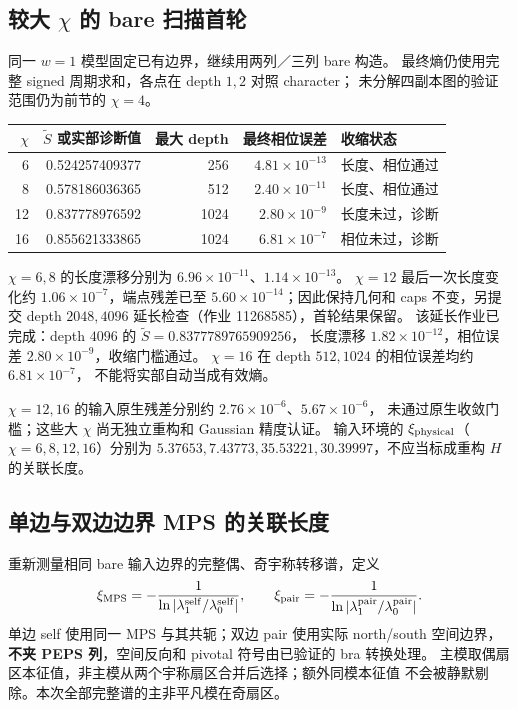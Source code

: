 \documentclass[11pt]{article}
\newcommand{\tS}{\widetilde S}
\begin{document}
\subsection{较大 $\chi$ 的 bare 扫描首轮}

同一 $w=1$ 模型固定已有边界，继续用两列／三列 bare 构造。
最终熵仍使用完整 signed 周期求和，各点在 depth $1,2$ 对照 character；
未分解四副本图的验证范围仍为前节的 $\chi=4$。
\begin{center}
\begin{tabular}{rrrrl}
\toprule
$\chi$ & $\tS$ 或实部诊断值 & 最大 depth & 最终相位误差 & 收缩状态\\
\midrule
6 & 0.524257409377 & 256 & $4.81\times10^{-13}$ & 长度、相位通过\\
8 & 0.578186036365 & 512 & $2.40\times10^{-11}$ & 长度、相位通过\\
12 & 0.837778976592 & 1024 & $2.80\times10^{-9}$ & 长度未过，诊断\\
16 & 0.855621333865 & 1024 & $6.81\times10^{-7}$ & 相位未过，诊断\\
\bottomrule
\end{tabular}
\end{center}
$\chi=6,8$ 的长度漂移分别为 $6.96\times10^{-11}$、$1.14\times10^{-13}$。
$\chi=12$ 最后一次长度变化约 $1.06\times10^{-7}$，端点残差已至
$5.60\times10^{-14}$；因此保持几何和 caps 不变，另提交 depth $2048,4096$
延长检查（作业 11268585），首轮结果保留。
该延长作业已完成：depth $4096$ 的 $\tS=0.8377789765909256$，
长度漂移 $1.82\times10^{-12}$，相位误差 $2.80\times10^{-9}$，收缩门槛通过。
$\chi=16$ 在 depth $512,1024$ 的相位误差均约 $6.81\times10^{-7}$，
不能将实部自动当成有效熵。

$\chi=12,16$ 的输入原生残差分别约 $2.76\times10^{-6}$、$5.67\times10^{-6}$，
未通过原生收敛门槛；这些大 $\chi$ 尚无独立重构和 Gaussian 精度认证。
输入环境的 $\xi_{\rm physical}$（$\chi=6,8,12,16$）分别为
$5.37653,7.43773,35.53221,30.39997$，不应当标成重构 $H$ 的关联长度。

\subsection{单边与双边边界 MPS 的关联长度}

重新测量相同 bare 输入边界的完整偶、奇宇称转移谱，定义
\begin{equation}
 \xi_{\rm MPS}=-\frac{1}{\ln|\lambda_1^{\rm self}/\lambda_0^{\rm self}|},\qquad
 \xi_{\rm pair}=-\frac{1}{\ln|\lambda_1^{\rm pair}/\lambda_0^{\rm pair}|}.
\end{equation}
单边 self 使用同一 MPS 与其共轭；双边 pair 使用实际 north/south 空间边界，
\textbf{不夹 PEPS 列}，空间反向和 pivotal 符号由已验证的 bra 转换处理。
主模取偶扇区本征值，非主模从两个宇称扇区合并后选择；额外同模本征值
不会被静默剔除。本次全部完整谱的主非平凡模在奇扇区。
\end{document}
